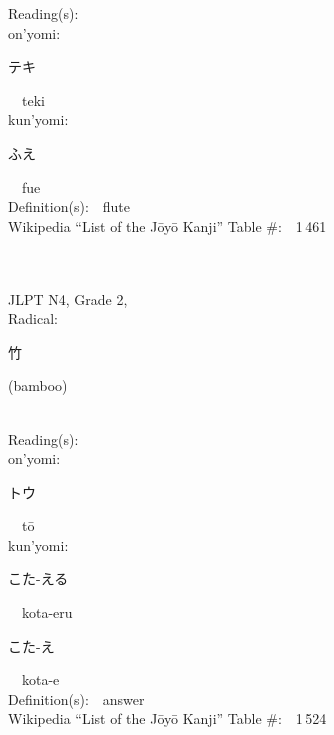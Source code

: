 \begin{multicols}{2}
Reading(s):\ \ \\
{\hspace*{1em}}on'yomi:\ \ \\
{\hspace*{2em}}{\begin{CJK}{UTF8}{min} テキ \end{CJK}}\ \ teki\ \ \\
{\hspace*{1em}}kun'yomi:\ \ \\
{\hspace*{2em}}{\begin{CJK}{UTF8}{min} ふえ \end{CJK}}\ \ fue\ \ \\
Definition(s):\ \ flute \\
Wikipedia ``List of the J\=oy\=o Kanji'' Table \#:\ \ 1\,461 \\
\ \ \\
{\fontsize{34pt}{40pt}  }\ \ \\  %
{JLPT N4, Grade 2, \\Radical:\ \ {\begin{CJK}{UTF8}{min} 竹 \end{CJK}} (bamboo) } \\
Reading(s):\ \ \\
{\hspace*{1em}}on'yomi:\ \ \\
{\hspace*{2em}}{\begin{CJK}{UTF8}{min} トウ \end{CJK}}\ \ t\=o\ \ \\
{\hspace*{1em}}kun'yomi:\ \ \\
{\hspace*{2em}}{\begin{CJK}{UTF8}{min} こた-える \end{CJK}}\ \ kota-eru\ \ \\
{\hspace*{2em}}{\begin{CJK}{UTF8}{min} こた-え \end{CJK}}\ \ kota-e\ \ \\
Definition(s):\ \ answer \\
Wikipedia ``List of the J\=oy\=o Kanji'' Table \#:\ \ 1\,524 \\

\end{multicols}
